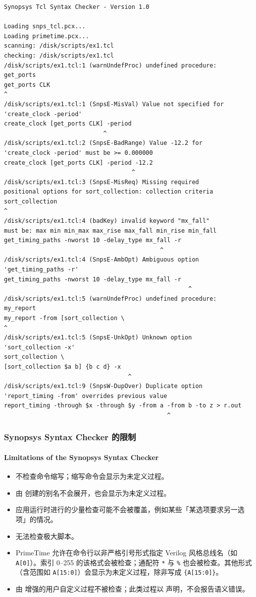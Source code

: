 \begin{lstlisting}[caption={snps\_checker 输出示例}]
% /synopsys/linux64/syn/bin/ptprocheck ex1.tcl
Synopsys Tcl Syntax Checker - Version 1.0

Loading snps_tcl.pcx...
Loading primetime.pcx...
scanning: /disk/scripts/ex1.tcl
checking: /disk/scripts/ex1.tcl
/disk/scripts/ex1.tcl:1 (warnUndefProc) undefined procedure:
get_ports
get_ports CLK
^
/disk/scripts/ex1.tcl:1 (SnpsE-MisVal) Value not specified for
'create_clock -period'
create_clock [get_ports CLK] -period
                            ^
/disk/scripts/ex1.tcl:2 (SnpsE-BadRange) Value -12.2 for
'create_clock -period' must be >= 0.000000
create_clock [get_ports CLK] -period -12.2
                                    ^
/disk/scripts/ex1.tcl:3 (SnpsE-MisReq) Missing required
positional options for sort_collection: collection criteria
sort_collection
^
/disk/scripts/ex1.tcl:4 (badKey) invalid keyword "mx_fall"
must be: max min min_max max_rise max_fall min_rise min_fall
get_timing_paths -nworst 10 -delay_type mx_fall -r
                                            ^
/disk/scripts/ex1.tcl:4 (SnpsE-AmbOpt) Ambiguous option
'get_timing_paths -r'
get_timing_paths -nworst 10 -delay_type mx_fall -r
                                                    ^
/disk/scripts/ex1.tcl:5 (warnUndefProc) undefined procedure:
my_report
my_report -from [sort_collection \
^
/disk/scripts/ex1.tcl:5 (SnpsE-UnkOpt) Unknown option
'sort_collection -x'
sort_collection \
[sort_collection $a b] {b c d} -x
                                   ^
/disk/scripts/ex1.tcl:9 (SnpsW-DupOver) Duplicate option
'report_timing -from' overrides previous value
report_timing -through $x -through $y -from a -from b -to z > r.out
                                              ^
\end{lstlisting}

\subsubsection{Synopsys Syntax Checker 的限制}
\paragraph*{Limitations of the Synopsys Syntax Checker}

\begin{itemize}
  \item 不检查命令缩写；缩写命令会显示为未定义过程。
  \item 由  创建的别名不会展开，也会显示为未定义过程。
  \item 应用运行时进行的少量检查可能不会被覆盖，例如某些「某选项要求另一选项」的情况。
  \item 无法检查极大脚本。
  \item PrimeTime 允许在命令行以非严格引号形式指定 Verilog 风格总线名（如 \texttt{A[0]}）。索引 0--255 的该格式会被检查；通配符 \texttt{*} 与 \texttt{\%} 也会被检查。其他形式（含范围如 \texttt{A[15:0]}）会显示为未定义过程，除非写成 \texttt{\{A[15:0]\}}。
  \item 由  增强的用户自定义过程不被检查；此类过程以  声明，不会报告语义错误。
\end{itemize}

